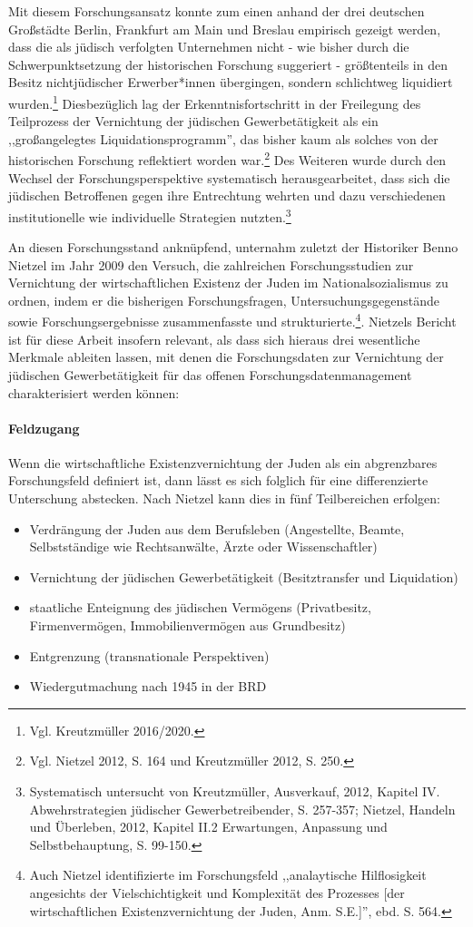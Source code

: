 Mit diesem Forschungsansatz konnte zum einen anhand der drei deutschen Großstädte Berlin, Frankfurt am Main und Breslau empirisch  gezeigt werden, dass die als jüdisch verfolgten Unternehmen nicht - wie bisher durch die Schwerpunktsetzung der historischen Forschung suggeriert - größtenteils in den Besitz nichtjüdischer Erwerber*innen übergingen, sondern schlichtweg liquidiert wurden.\footnote{Vgl. Kreutzmüller 2016/2020.} Diesbezüglich lag der Erkenntnisfortschritt in der Freilegung des Teilprozess der Vernichtung der jüdischen Gewerbetätigkeit als ein ,,großangelegtes Liquidationsprogramm'', das bisher kaum als solches von der historischen Forschung reflektiert worden war.\footnote{Vgl. Nietzel 2012, S. 164 und Kreutzmüller 2012, S. 250.} Des Weiteren wurde durch den Wechsel der Forschungsperspektive systematisch herausgearbeitet, dass sich die jüdischen Betroffenen gegen ihre Entrechtung wehrten und dazu verschiedenen institutionelle wie individuelle Strategien nutzten.\footnote{Systematisch untersucht von Kreutzmüller, Ausverkauf, 2012, Kapitel IV. Abwehrstrategien jüdischer Gewerbetreibender, S. 257-357; Nietzel, Handeln und Überleben, 2012, Kapitel II.2 Erwartungen, Anpassung und Selbstbehauptung, S. 99-150.}

An diesen Forschungsstand anknüpfend, unternahm zuletzt der Historiker Benno Nietzel im Jahr 2009 den Versuch, die zahlreichen Forschungsstudien zur Vernichtung der wirtschaftlichen Existenz der Juden im Nationalsozialismus zu ordnen, indem er die bisherigen Forschungsfragen, Untersuchungsgegenstände sowie Forschungsergebnisse zusammenfasste und strukturierte.\footnote{Auch Nietzel identifizierte im Forschungsfeld ,,analaytische Hilflosigkeit angesichts der Vielschichtigkeit und Komplexität des Prozesses [der wirtschaftlichen Existenzvernichtung der Juden, Anm. S.E.]'', ebd. S. 564.}. Nietzels Bericht ist für diese Arbeit insofern relevant, als dass sich hieraus drei wesentliche Merkmale ableiten lassen, mit denen die Forschungsdaten zur Vernichtung der jüdischen Gewerbetätigkeit für das offenen Forschungsdatenmanagement charakterisiert werden können:

\paragraph{Feldzugang}Wenn die wirtschaftliche Existenzvernichtung der Juden als ein abgrenzbares Forschungsfeld definiert ist, dann lässt es sich folglich für eine differenzierte Unterschung abstecken. Nach Nietzel kann dies in fünf Teilbereichen erfolgen:
\begin{itemize}
\item Verdrängung der Juden aus dem Berufsleben (Angestellte, Beamte, Selbstständige wie Rechtsanwälte, Ärzte oder Wissenschaftler)
\item Vernichtung der jüdischen Gewerbetätigkeit (Besitztransfer und Liquidation)
\item staatliche Enteignung des jüdischen Vermögens (Privatbesitz, Firmenvermögen, Immobilienvermögen aus Grundbesitz) 
\item Entgrenzung (transnationale Perspektiven)
\item Wiedergutmachung nach 1945 in der BRD
\end{itemize}

